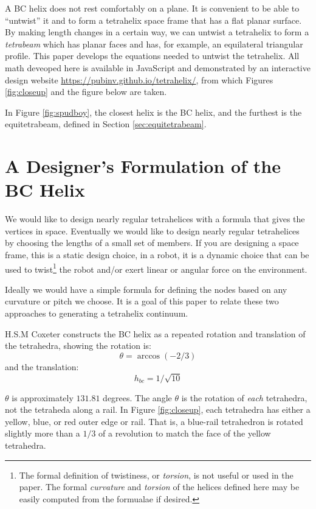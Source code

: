 \documentclass[11pt]{article}
\begin{document}
A BC helix does not rest comfortably on a plane. It is convenient to
be able to ``untwist'' it and to form a tetrahelix space frame that has a
flat planar surface. By making length changes in a certain way, we can
untwist a tetrahelix to form a \emph{tetrabeam} which has planar faces
and has, for example, an equilateral triangular profile. This paper
develops the equations needed to untwist the tetrahelix. All math
deveoped here is available in JavaScript and demonstrated by an interactive
design website \url{https://pubinv.github.io/tetrahelix/}\cite{readtetrahelix},
from which Figures \ref{fig:closeup} and
the figure below are taken.


In Figure \ref{fig:spudboy}, the closest helix is the BC helix, and the furthest
is the equitetrabeam, defined in Section \ref{sec:equitetrabeam}.

\section{A Designer's Formulation of the BC Helix}

We would like to design nearly regular tetrahelices with a formula that
gives the vertices in space. Eventually we would like to design nearly regular
tetrahelices by choosing the lengths of a small set of members.
If you are designing a
space frame, this is a static design choice, in a robot, it is a
dynamic choice that can be used to twist\footnote{The formal definition of twistiness, or \emph{torsion},
  is not useful or used in the paper. The formal \emph{curvature} and \emph{torsion} of the helices defined here
may be easily computed from the formualae if desired.} the robot and/or exert linear or
angular force on the environment.

Ideally we would have a simple formula for defining the nodes based on
any curvature or pitch we choose. It is a goal of
this paper to relate these two approaches to generating a tetrahelix
continuum.


H.S.M Coxeter constructs the BC helix\cite{coxeter1985simplicial} as a repeated rotation and translation of the tetrahedra, showing the
rotation is:
\[
\theta = \arccos(-2/3) 
\]
and the translation:
\[
h_{bc} = 1/\sqrt{10}
\]

$\theta$ is approximately $131.81$ degrees.
The angle $\theta$ is the rotation of \emph{each} tetrahedra, not the tetraheda along a rail.  In Figure \ref{fig:closeup},
each tetrahedra has either a yellow, blue, or red outer edge or rail.
That is, a blue-rail tetrahedron is rotated slightly more than a $1/3$ of a revolution to match the face of the yellow tetrahedra.
\end{document}

